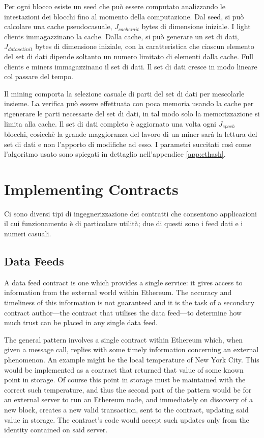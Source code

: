 \documentclass[9pt,oneside]{amsart}
\begin{document}
\begin{multicols}{2}
Per ogni blocco esiste un seed che può essere computato analizzando le intestazioni dei blocchi fino al momento della computazione. Dal seed, si può calcolare una cache pseudocasuale, $J_{cacheinit}$ bytes di dimensione iniziale. I light clients immagazzinano la cache. Dalla cache, si può generare un set di dati, $J_{datasetinit}$ bytes di dimensione iniziale, con la caratteristica che ciascun elemento del set di dati dipende soltanto un numero limitato di elementi dalla cache. Full clients e miners immagazzinano il set di dati. Il set di dati cresce in modo lineare col passare del tempo.

Il mining comporta la selezione casuale di parti del set di dati per mescolarle insieme. La verifica può essere effettuata con poca memoria usando la cache per rigenerare le parti necessarie del set di dati, in tal modo solo la memorizzazione si limita alla cache. Il set di dati completo è aggiornato una volta ogni $J_{epoch}$ blocchi, cosicchè la grande maggioranza del lavoro di un miner sarà la lettura del set di dati e non l'apporto di modifiche ad esso. I parametri succitati così come l'algoritmo usato sono spiegati in dettaglio nell'appendice \ref{app:ethash}.

\section{Implementing Contracts}

Ci sono diversi tipi di ingegnerizzazione dei contratti che consentono applicazioni il cui funzionamento è di particolare utilità; due di questi sono i feed dati e i numeri casuali. 

\subsection{Data Feeds}
A data feed contract is one which provides a single service: it gives access to information from the external world within Ethereum. The accuracy and timeliness of this information is not guaranteed and it is the task of a secondary contract author---the contract that utilises the data feed---to determine how much trust can be placed in any single data feed.

The general pattern involves a single contract within Ethereum which, when given a message call, replies with some timely information concerning an external phenomenon. An example might be the local temperature of New York City. This would be implemented as a contract that returned that value of some known point in storage. Of course this point in storage must be maintained with the correct such temperature, and thus the second part of the pattern would be for an external server to run an Ethereum node, and immediately on discovery of a new block, creates a new valid transaction, sent to the contract, updating said value in storage. The contract's code would accept such updates only from the identity contained on said server.


\end{multicols}
\end{document}
